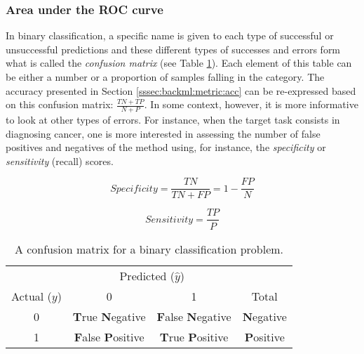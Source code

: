 \subsubsection{Area under the ROC curve}
\label{sssec:backml:metric:rocauc}

In binary classification, a specific name is given to each type of successful or
unsuccessful predictions and these different types of successes and errors form
what is called the \textit{confusion matrix} (see Table \ref{tab:backml:confusion}).
Each element of this table can be either a number or a proportion of samples
falling in the category. The accuracy presented in Section \ref{sssec:backml:metric:acc}
can be re-expressed based on this confusion matrix: $\frac{TN + TP}{N + P}$. In
some context, however, it is more informative to look at other types of errors.
For instance, when the target task consists in diagnosing cancer, one is more
interested in assessing the number of false positives and negatives of the method
using, for instance, the \textit{specificity} or \textit{sensitivity} (\aka recall)
scores.

\begin{equation}
\label{eqn:backml:specifity}
\textit{Specificity} = \frac{TN}{TN + FP} = 1 - \frac{FP}{N}
\end{equation}

\begin{equation}
\label{eqn:backml:sensitivity}
\textit{Sensitivity} = \frac{TP}{P}
\end{equation}

\begin{table}
  \centering
  \begin{tabular}{c|cc|c}
  & \multicolumn{2}{c}{Predicted ($\hat{y}$)} & \\
  Actual ($y$) & 0 & 1 & Total \\
  \hline
  0 & \textbf{T}rue \textbf{N}egative & \textbf{F}alse \textbf{N}egative & \textbf{N}egative \\
  1 & \textbf{F}alse \textbf{P}ositive & \textbf{T}rue \textbf{P}ositive & \textbf{P}ositive \\
  \end{tabular}
  \caption{A confusion matrix for a binary classification problem.}
  \label{tab:backml:confusion}
\end{table}

